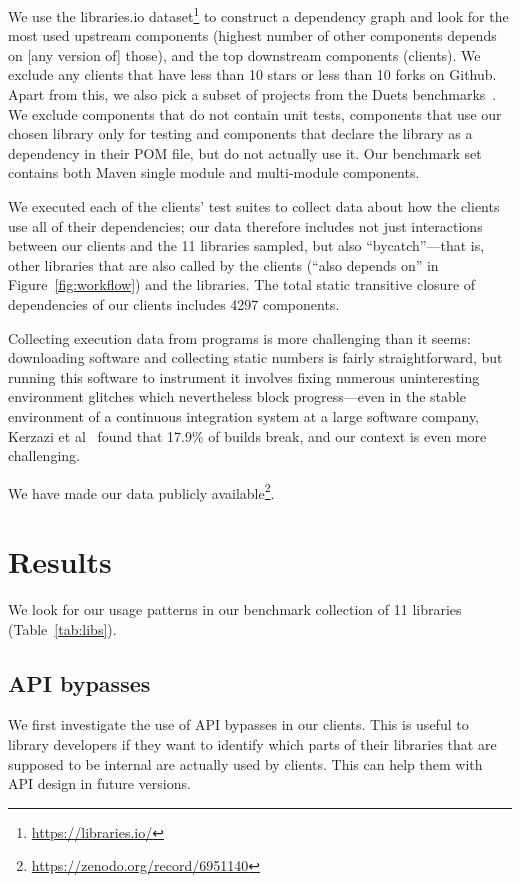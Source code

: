 We use the libraries.io dataset\footnote{\url{https://libraries.io/}} to construct a dependency graph and look for the most used upstream components (highest number of other components depends on [any version of] those), 
and the top downstream components (clients). We exclude any clients that have less than 10 stars or less than 10 forks on Github.  Apart from this, we also pick a subset of projects from the
Duets benchmarks~\cite{durieux21}. We exclude components that do not contain unit tests, components that use our chosen library only for testing
and components that declare the library as a dependency in their POM file, but do not actually use it. Our benchmark set contains both Maven single module and multi-module components.

We executed each of the clients' test suites to collect data about how the clients use all of their dependencies; our data therefore includes not just interactions between our clients and the 11 libraries sampled, but also ``bycatch''---that is, other libraries that are also called by the clients (``also depends on'' in Figure~\ref{fig:workflow}) and the libraries. The total static transitive closure of dependencies of our clients includes 4297 components.

Collecting execution data from programs is more challenging than it seems: downloading software and collecting static numbers is fairly straightforward, but running this software to instrument it involves fixing numerous uninteresting environment glitches which nevertheless block progress---even in the stable environment of a continuous integration system at a large software company, Kerzazi et al~\cite{kerzazi14:_why_do_autom_build_break} found that 17.9\% of builds break, and our context is even more challenging.

We have made our data publicly available\footnote{\url{https://zenodo.org/record/6951140}}.

\section{Results}
\label{sec:results}

We look for our usage patterns in our benchmark collection of 11 libraries (Table~\ref{tab:libs}).

\subsection{API bypasses}
We first investigate the use of API bypasses in our clients. This is useful to library developers if they want to identify which parts of their libraries that are supposed to be internal are actually used by clients. This can help them with API design in future versions. 

